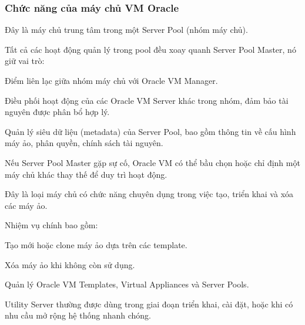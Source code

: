 \subsubsection{Chức năng của máy chủ VM Oracle}
\begin{myitem}
\item Đây là máy chủ trung tâm trong một Server Pool (nhóm máy chủ).
\item Tất cả các hoạt động quản lý trong pool đều xoay quanh Server Pool Master, nó giữ vai trò:
  \begin{mysubitem}
  \item Điểm liên lạc giữa nhóm máy chủ với Oracle VM Manager.
  
  \item Điều phối hoạt động của các Oracle VM Server khác trong nhóm, đảm bảo tài nguyên được phân bổ hợp lý.
  
  \item Quản lý siêu dữ liệu (metadata) của Server Pool, bao gồm thông tin về cấu hình máy ảo, phân quyền, chính sách tài nguyên.

  \end{mysubitem}

\item Nếu Server Pool Master gặp sự cố, Oracle VM có thể bầu chọn hoặc chỉ định một máy chủ khác thay thế để duy trì hoạt động.
\end{myitem}

\begin{myitem}
\item Đây là loại máy chủ có chức năng chuyên dụng trong việc tạo, triển khai và xóa các máy ảo.

\item Nhiệm vụ chính bao gồm:

  \begin{mysubitem}
  \item Tạo mới hoặc clone máy ảo dựa trên các template.
  
  \item Xóa máy ảo khi không còn sử dụng.
  
  \item Quản lý Oracle VM Templates, Virtual Appliances và Server Pools.

  \end{mysubitem}

\item Utility Server thường được dùng trong giai đoạn triển khai, cài đặt, hoặc khi có nhu cầu mở rộng hệ thống nhanh chóng.

\end{myitem}

